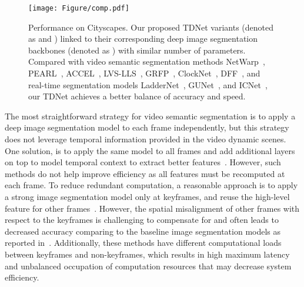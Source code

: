 \documentclass[10pt,twocolumn,letterpaper]{article}
\begin{document}
\begin{figure}
\centering
\texttt{[image: Figure/comp.pdf]}
\vspace{-0.4cm}
    \caption{\small{ Performance on Cityscapes. Our proposed TDNet variants (denoted as  and  ) linked to their corresponding deep image segmentation backbones (denoted as ) with similar number of parameters.  
Compared with video semantic segmentation methods NetWarp~\cite{gadde2017semantic}, PEARL~\cite{jin2017video}, ACCEL~\cite{jain2019accel}, LVS-LLS~\cite{li2018low}, GRFP~\cite{nilsson2018semantic}, ClockNet~\cite{shelhamer2016clockwork}, DFF~\cite{zhu2017deep}, and real-time segmentation models LadderNet~\cite{kreso2017ladder}, GUNet~\cite{mazzini2018guided}, and ICNet~\cite{zhao2018icnet}, our TDNet achieves a better balance of accuracy and speed. 
}}
\label{fig1}
\vspace{-0.5cm}
\end{figure}

The most straightforward strategy for video semantic segmentation is to apply a deep image segmentation model to each frame independently, but this strategy does not leverage temporal information provided in the video dynamic scenes. 
One solution, is to apply the same model to all frames and add additional layers on top to model temporal context to extract better features~\cite{gadde2017semantic,jin2017video,kundu2016feature,nilsson2018semantic}.
However, such methods do not help improve efficiency as all features must be recomputed at each frame. 
To reduce redundant computation, a reasonable approach is to apply a strong image segmentation model only at keyframes, and reuse the high-level feature for other frames~\cite{jain2019accel,li2018low,mahasseni2017budget,zhu2017deep}. 
However, the spatial misalignment of other frames with respect to the keyframes is challenging to compensate for and often leads to decreased accuracy comparing to the baseline image segmentation models as reported in~\cite{jain2019accel,li2018low,mahasseni2017budget,zhu2017deep}. 
Additionally, these methods have different computational loads between keyframes and non-keyframes, which results in high maximum latency and unbalanced occupation of computation resources that may decrease system efficiency.
\end{document}
